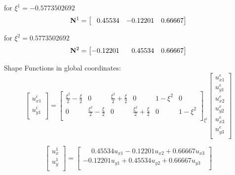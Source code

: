 for $ \xi^1 = -0.5773502692 $
\begin{equation}
    \mathbf{N}^1 = \begin{bmatrix}
        \phantom{-}0.45534 & -0.12201 & 0.66667
    \end{bmatrix}
\end{equation}

for $ \xi^2 = 0.5773502692 $
\begin{equation}
    \mathbf{N}^2 = \begin{bmatrix}
        -0.12201 & \phantom{-}0.45534 & 0.66667
    \end{bmatrix}
\end{equation}

Shape Functions in global coordinates:
\begin{equation}
    \begin{bmatrix}
        u_{x1}^i \\
        u_{y1}^i \\
    \end{bmatrix}
    = \begin{bmatrix}
        \frac{\xi^2}{2} - \frac{\xi}{2} &
        0 &
        \frac{\xi^2}{2} + \frac{\xi}{2} &
        0 &
        1 - \xi^2 &
        0 \\
        0 &
        \frac{\xi^2}{2} - \frac{\xi}{2} &
        0 &
        \frac{\xi^2}{2} + \frac{\xi}{2} &
        0 &
        1 - \xi^2 \\
    \end{bmatrix}_{\xi^i}
    \begin{bmatrix}
        u_{x1}^e \\
        u_{y1}^e \\
        u_{x2}^e \\
        u_{y2}^e \\
        u_{x3}^e \\
        u_{y3}^e \\
    \end{bmatrix}
\end{equation}

\begin{equation}
    \begin{bmatrix}
        u_{x}^1 \\
        u_{y}^1 \\
    \end{bmatrix}
    = \begin{bmatrix}
        \phantom{-}0.45534 u_{x1} - 0.12201 u_{x2} + 0.66667 u_{x3} \\
        -0.12201 u_{y1} + 0.45534 u_{y2} + 0.66667 u_{y3} \\
    \end{bmatrix}
\end{equation}

